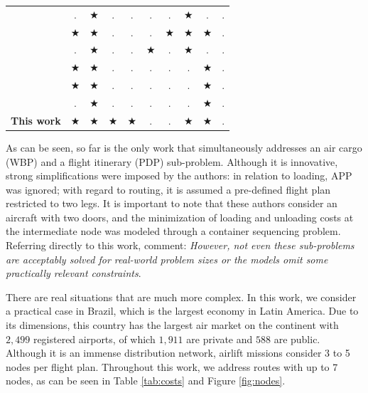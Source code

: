 \documentclass[preprint,authoryear]{elsarticle}
\begin{document}
\begin{table}[H]
\begin{tabular}{r|cc|cc|cc|ccc}
		\cite{RoesenerBarnes2016}  & $.$ & $\bigstar$   & $.$ & $.$ & $.$ & $.$   & $\bigstar$  & $.$  &  $.$ \\
		\cite{PaquaySchynsLimbourg2016,PaquayLimbourgSchynsOliveira2018}  & $\bigstar$ & $\bigstar$ & $.$ & $.$ & $.$ & $\bigstar$ & $\bigstar$  & $\bigstar$ & $.$ \\
		\cite{YangLiuGao2018} & $.$ & $\bigstar$  & $.$  & $.$ & $\bigstar$  & $.$ & $\bigstar$ & $.$  & $.$ \\
		\cite{wong2020} & $\bigstar$  & $\bigstar$  & $.$  & $.$   & $.$  & $.$ & $.$ & $\bigstar$  & $.$  \\
		\cite{eugene2021} & $\bigstar$ & $\bigstar$ & $.$  & $.$   & $.$ & $.$ & $.$ & $\bigstar$  & $.$  \\
		\cite{zhao2021} & $.$ & $\bigstar$ & $.$  & $.$  & $.$ & $.$ & $.$  & $\bigstar$ &  $.$ \\
		{\bf This work}   & $\bigstar$ & $\bigstar$  & $\bigstar$& $\bigstar$ & $.$ & $.$ & $\bigstar$ & $\bigstar$   &  $.$  \\
		\bottomrule 
	\end{tabular}
	\normalsize 
\end{table}

As can be seen, so far \cite{LurkinSchyns2015} is the only work that simultaneously addresses an air cargo (WBP) and a flight itinerary (PDP) sub-problem. Although it is innovative, strong simplifications were imposed by the authors: in relation to loading, APP was ignored; with regard to routing, it is assumed a pre-defined flight plan restricted to two legs. It is important to note that these authors consider an aircraft with two doors, and the minimization of loading and unloading costs at the intermediate node was modeled through a container sequencing problem. Referring directly to this work, \cite[p. 409]{BrandtStefan2019} comment: {\it However, not even these sub-problems are acceptably solved for real-world problem sizes or the models omit some practically relevant constraints}. 

There are real situations that are much more complex. In this work, we consider a practical case in Brazil, which is the largest economy in Latin America. Due to its dimensions, this country has the largest air market on the continent with $2,499$\/ registered airports, of which $1,911$\/ are private and $588$\/ are public. Although it is an immense distribution network, airlift missions consider 3 to 5 nodes per flight plan. Throughout this work, we address routes with up to 7 nodes, as can be seen in Table \ref{tab:costs} and Figure \ref{fig:nodes}.
\end{document}
